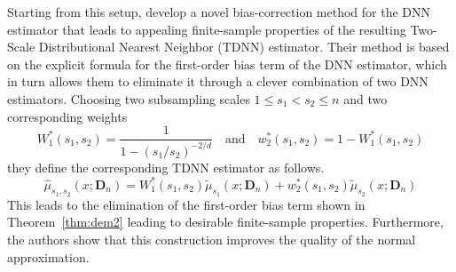 Starting from this setup, \citet{demirkaya_optimal_2024} develop a novel
bias-correction method for the DNN estimator that leads to appealing
finite-sample properties of the resulting Two-Scale Distributional Nearest
Neighbor (TDNN) estimator. Their method is based on the explicit formula for
the first-order bias term of the DNN estimator, which in turn allows them to
eliminate it through a clever combination of two DNN estimators. Choosing two
subsampling scales $1 \leq s_1 < s_2 \leq n$ and two corresponding weights
\begin{equation}
	W_{1}^{*}(s_1, s_2) = \frac{1}{1-(s_1/s_2)^{-2/d}}
	\quad\text{and}\quad
	w_2^{*}(s_1, s_2) = 1 - W_{1}^{*}(s_1, s_2)
\end{equation}
they define the corresponding TDNN estimator as follows.
\begin{equation}
	\hat{\mu}_{s_1, s_2}\left(x; \mathbf{D}_n\right)
	= W_{1}^{*}(s_1, s_2)\tilde{\mu}_{s_1}\left(x; \mathbf{D}_n\right) + w_2^{*}(s_1, s_2)\tilde{\mu}_{s_2}\left(x; \mathbf{D}_n\right)
\end{equation}
This leads to the elimination of the first-order bias term shown in Theorem~\ref{thm:dem2} leading to desirable finite-sample properties.
Furthermore, the authors show that this construction improves the quality of the normal approximation.

